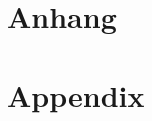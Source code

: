 %
%
\begin{appendix}
{\chapter*{Anhang}\label{sec:Anhang}
	\setcounter{chapter}{1}
}{}	
{\chapter*{Appendix}\label{sec:appendix}
	\setcounter{chapter}{1}
}{}		



\end{appendix}
